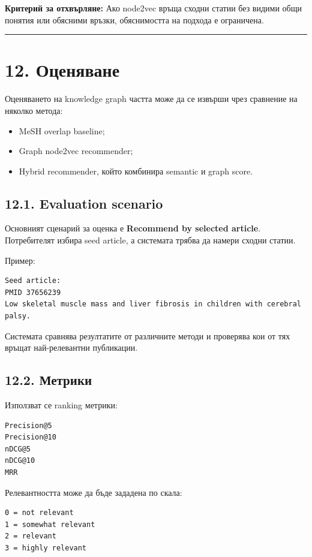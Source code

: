 \documentclass[12pt,a4paper]{article}
\providecommand{\tightlist}{\setlength{\itemsep}{0pt}\setlength{\parskip}{0pt}}
\begin{document}
\textbf{Критерий за отхвърляне:} Ако node2vec връща сходни статии без видими общи понятия или обясними връзки, обяснимостта на подхода е ограничена.

\vspace{0.5em}\hrule\vspace{1.0em}

\section{12. Оценяване}

Оценяването на knowledge graph частта може да се извърши чрез сравнение на няколко метода:

\begin{itemize}
\tightlist
\item
  MeSH overlap baseline;
\item
  Graph node2vec recommender;
\item
  Hybrid recommender, който комбинира semantic и graph score.
\end{itemize}

\subsection{12.1. Evaluation scenario}

Основният сценарий за оценка е \textbf{Recommend by selected article}. Потребителят избира seed article, а системата трябва да намери сходни статии.

Пример:

\begin{verbatim}
Seed article:
PMID 37656239
Low skeletal muscle mass and liver fibrosis in children with cerebral palsy.
\end{verbatim}

Системата сравнява резултатите от различните методи и проверява кои от тях връщат най-релевантни публикации.

\subsection{12.2. Метрики}

Използват се ranking метрики:

\begin{verbatim}
Precision@5
Precision@10
nDCG@5
nDCG@10
MRR
\end{verbatim}

Релевантността може да бъде зададена по скала:

\begin{verbatim}
0 = not relevant
1 = somewhat relevant
2 = relevant
3 = highly relevant
\end{verbatim}
\end{document}

